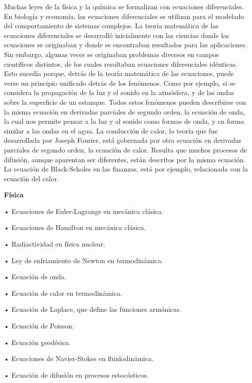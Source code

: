 \textcolor{gris}{Muchas leyes de la física y la química se formalizan con ecuaciones diferenciales. En biología y economía, las ecuaciones diferenciales se utilizan para el modelado del comportamiento de sistemas complejos. La teoría matemática de las ecuaciones diferenciales se desarrolló inicialmente con las ciencias donde las ecuaciones se originaban y donde se encontraban resultados para las aplicaciones. Sin embargo, algunas veces se originaban problemas diversos en campos científicos distintos, de los cuales resultaban ecuaciones diferenciales idénticas. Esto sucedía porque, detrás de la teoría matemática de las ecuaciones, puede verse un principio unificado detrás de los fenómenos. Como por ejemplo, si se considera la propagación de la luz y el sonido en la atmósfera, y de las ondas sobre la superficie de un estanque. Todos estos fenómenos pueden describirse con la misma ecuación en derivadas parciales de segundo orden, la ecuación de onda, la cual nos permite pensar a la luz y al sonido como formas de onda, y en forma similar a las ondas en el agua. La conducción de calor, la teoría que fue desarrollada por Joseph Fourier, está gobernada por otra ecuación en derivadas parciales de segundo orden, la ecuación de calor. Resulta que muchos procesos de difusión, aunque aparentan ser diferentes, están descritos por la misma ecuación. La ecuación de Black-Scholes en las finanzas, está por ejemplo, relacionada con la ecuación del calor.}

\textcolor{gris}{\textbf{Física}}

\textcolor{gris}{•	Ecuaciones de Euler-Lagrange en mecánica clásica.}

\textcolor{gris}{•	Ecuaciones de Hamilton en mecánica clásica.}

\textcolor{gris}{•	Radiactividad en física nuclear.}

\textcolor{gris}{•	Ley de enfriamiento de Newton en termodinámica.}

\textcolor{gris}{•	Ecuación de onda.}

\textcolor{gris}{•	Ecuación de calor en termodinámica.}

\textcolor{gris}{•	Ecuación de Laplace, que define las funciones armónicas.}

\textcolor{gris}{•	Ecuación de Poisson.}

\textcolor{gris}{•	Ecuación geodésica.}

\textcolor{gris}{•	Ecuaciones de Navier-Stokes en fluidodinámica.}

\textcolor{gris}{•	Ecuación de difusión en procesos estocásticos.}

